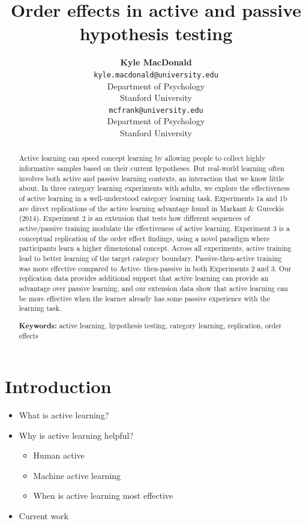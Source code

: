 \documentclass[10pt, letterpaper]{article}
\title{Order effects in active and passive hypothesis testing}
\author{{\large \bf Kyle MacDonald} \\ \texttt{kyle.macdonald@university.edu} \\ Department of Psychology \\ Stanford University \And {\large \bf Michael C. Frank} \\ \texttt{mcfrank@university.edu} \\ Department of Psychology \\ Stanford University}
\begin{document}
\maketitle

\begin{abstract}
Active learning can speed concept learning by allowing people to collect
highly informative samples based on their current hypotheses. But
real-world learning often involves both active and passive learning
contexts, an interaction that we know little about. In three category
learning experiments with adults, we explore the effectiveness of active
learning in a well-understood category learning task. Experiments 1a and
1b are direct replications of the active learning advantage found in
Markant \& Gureckis (2014). Experiment 2 is an extension that tests how
different sequences of active/passive training modulate the
effectiveness of active learning. Experiment 3 is a conceptual
replication of the order effect findings, using a novel paradigm where
participants learn a higher dimensional concept. Across all experiments,
active training lead to better learning of the target category boundary.
Passive-then-active training was more effective compared to Active-
then-passive in both Experiments 2 and 3. Our replication data provides
additional support that active learning can provide an advantage over
passive learning, and our extension data show that active learning can
be more effective when the learner already has some passive experience
with the learning task.

\textbf{Keywords:}
active learning, hypothesis testing, category learning, replication,
order effects
\end{abstract}

\section{Introduction}\label{introduction}

\begin{itemize}
\item
  What is active learning?
\item
  Why is active learning helpful?

  \begin{itemize}
  \itemsep1pt\parskip0pt
  \item
    Human active
  \item
    Machine active learning
  \item
    When is active learning most effective
  \end{itemize}
\item
  Current work
\end{itemize}
\end{document}
